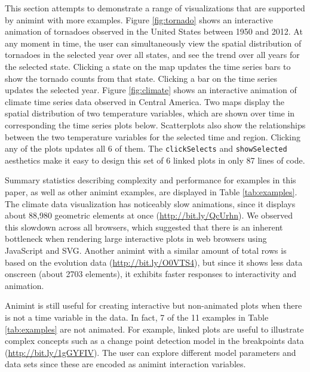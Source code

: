 \documentclass[12pt,]{isuthesis}
\begin{document}
This section attempts to demonstrate a range of visualizations that are
supported by animint with more examples. Figure \ref{fig:tornado} shows
an interactive animation of tornadoes observed in the United States
between 1950 and 2012. At any moment in time, the user can
simultaneously view the spatial distribution of tornadoes in the
selected year over all states, and see the trend over all years for the
selected state. Clicking a state on the map updates the time series bars
to show the tornado counts from that state. Clicking a bar on the time
series updates the selected year. Figure \ref{fig:climate} shows an
interactive animation of climate time series data observed in Central
America. Two maps display the spatial distribution of two temperature
variables, which are shown over time in corresponding the time series
plots below. Scatterplots also show the relationships between the two
temperature variables for the selected time and region. Clicking any of
the plots updates all 6 of them. The \texttt{clickSelects} and
\texttt{showSelected} aesthetics make it easy to design this set of 6
linked plots in only 87 lines of code.

Summary statistics describing complexity and performance for examples in
this paper, as well as other animint examples, are displayed in Table
\ref{tab:examples}. The climate data visualization has noticeably slow
animations, since it displays about 88,980 geometric elements at once
(\url{http://bit.ly/QcUrhn}). We observed this slowdown across all
browsers, which suggested that there is an inherent bottleneck when
rendering large interactive plots in web browsers using JavaScript and
SVG. Another animint with a similar amount of total rows is based on the
evolution data (\url{http://bit.ly/O0VTS4}), but since it shows less
data onscreen (about 2703 elements), it exhibits faster responses to
interactivity and animation.

Animint is still useful for creating interactive but non-animated plots
when there is not a time variable in the data. In fact, 7 of the 11
examples in Table \ref{tab:examples} are not animated. For example,
linked plots are useful to illustrate complex concepts such as a change
point detection model in the breakpoints data
(\url{http://bit.ly/1gGYFIV}). The user can explore different model
parameters and data sets since these are encoded as animint interaction
variables.
\end{document}
